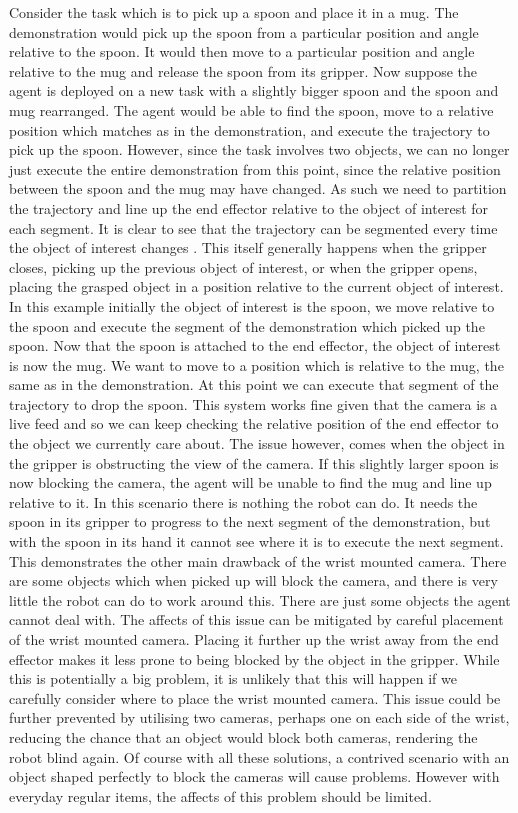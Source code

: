 Consider the task which is to pick up a spoon and place it in a mug. The demonstration would pick up the spoon from a particular position and angle relative to the spoon. It would then move to a particular position and angle relative to the mug and release the spoon from its gripper. Now suppose the agent is deployed on a new task with a slightly bigger spoon and the spoon and mug rearranged. The agent would be able to find the spoon, move to a relative position which matches as in the demonstration, and execute the trajectory to pick up the spoon. However, since the task involves two objects, we can no longer just execute the entire demonstration from this point, since the relative position between the spoon and the mug may have changed. As such we need to partition the trajectory and line up the end effector relative to the object of interest for each segment. It is clear to see that the trajectory can be segmented every time the object of interest changes \cite{mimicgen}. This itself generally happens when the gripper closes, picking up the previous object of interest, or when the gripper opens, placing the grasped object in a position relative to the current object of interest. In this example initially the object of interest is the spoon, we move relative to the spoon and execute the segment of the demonstration which picked up the spoon. Now that the spoon is attached to the end effector, the object of interest is now the mug. We want to move to a position which is relative to the mug, the same as in the demonstration. At this point we can execute that segment of the trajectory to drop the spoon. This system works fine given that the camera is a live feed and so we can keep checking the relative position of the end effector to the object we currently care about. The issue however, comes when the object in the gripper is obstructing the view of the camera. If this slightly larger spoon is now blocking the camera, the agent will be unable to find the mug and line up relative to it. In this scenario there is nothing the robot can do. It needs the spoon in its gripper to progress to the next segment of the demonstration, but with the spoon in its hand it cannot see where it is to execute the next segment. This demonstrates the other main drawback of the wrist mounted camera. There are some objects which when picked up will block the camera, and there is very little the robot can do to work around this. There are just some objects the agent cannot deal with. The affects of this issue can be mitigated by careful placement of the wrist mounted camera. Placing it further up the wrist away from the end effector makes it less prone to being blocked by the object in the gripper. While this is potentially a big problem, it is unlikely that this will happen if we carefully consider where to place the wrist mounted camera. This issue could be further prevented by utilising two cameras, perhaps one on each side of the wrist, reducing the chance that an object would block both cameras, rendering the robot blind again. Of course with all these solutions, a contrived scenario with an object shaped perfectly to block the cameras will cause problems. However with everyday regular items, the affects of this problem should be limited.

